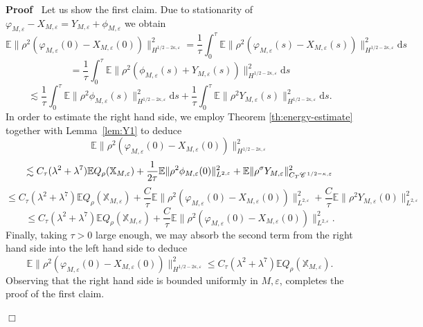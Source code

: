 \documentclass[a4paper,11pt]{article}
\newcommand{\mathd}{\mathrm{d}}
\newenvironment{proof}{\noindent\textbf{Proof\ }}{\hspace*{\fill}$\Box$\medskip}
\numberwithin{equation}{section}
\newcommand{\CC}{\mathscr{C} \hspace{.1em}}
\begin{document}
\begin{proof}
  Let us  show the first claim. Due to stationarity of $\varphi_{M,
  \varepsilon} - X_{M, \varepsilon} = Y_{M, \varepsilon} + \phi_{M,
  \varepsilon}$ we obtain
  \[ \mathbb{E} \| \rho^2 (\varphi_{M, \varepsilon} (0) - X_{M, \varepsilon}
     (0)) \|_{H^{1 / 2 - 2 \kappa, \varepsilon}}^2 = \frac{1}{\tau}
     \int_0^{\tau} \mathbb{E} \| \rho^2 (\varphi_{M, \varepsilon} (s) - X_{M,
     \varepsilon} (s)) \|_{H^{1 / 2 - 2 \kappa, \varepsilon}}^2 \mathd s \]
  \[ = \frac{1}{\tau} \int_0^{\tau} \mathbb{E} \| \rho^2 (\phi_{M,
     \varepsilon} (s) + Y_{M, \varepsilon} (s)) \|_{H^{1 / 2 - 2 \kappa,
     \varepsilon}}^2 \mathd s \]
  \[ \lesssim \frac{1}{\tau} \int_0^{\tau} \mathbb{E} \| \rho^2 \phi_{M,
     \varepsilon} (s) \|_{H^{1 / 2 - 2 \kappa, \varepsilon}}^2 \mathd s +
     \frac{1}{\tau} \int_0^{\tau} \mathbb{E} \| \rho^2 Y_{M, \varepsilon} (s)
     \|_{H^{1 / 2 - 2 \kappa, \varepsilon}}^2 \mathd s. \]
  In order to estimate the  right hand side, we employ Theorem \ref{th:energy-estimate} together with Lemma~\ref{lem:Y1} to deduce
  \[ \mathbb{E} \| \rho^2 (\varphi_{M, \varepsilon} (0) - X_{M, \varepsilon}
     (0)) \|_{H^{1 / 2 - 2 \kappa, \varepsilon}}^2 \]
  \[ \lesssim C_{\tau}(\lambda^2 +  \lambda^{7})\mathbb{E}Q_{\rho}
     (\mathbb{X}_{M, \varepsilon}) + \frac{1}{2\tau} \mathbb{E} \| \rho^2 \phi_{M,
     \varepsilon} (0) \|_{L^{2, \varepsilon}}^2 +\mathbb{E}\|\rho^{\sigma}Y_{M,\varepsilon}\|_{C_{T}\CC^{1/2-\kappa,\varepsilon}}^{2}\]
  \[ \leqslant C_{\tau} (\lambda^2 +  \lambda^{7})\mathbb{E}Q_{\rho} (\mathbb{X}_{M, \varepsilon}) +\frac{C}{\tau}
     \mathbb{E} \| \rho^2 (\varphi_{M, \varepsilon} (0) - X_{M, \varepsilon}
     (0)) \|_{L^{2, \varepsilon}}^2 + \frac{C}{\tau}\mathbb{E} \| \rho^2 Y_{M,\varepsilon}
     (0) \|_{L^{2, \varepsilon}}^2 \]
  \[ \leqslant C_{\tau}(\lambda^2 +  \lambda^{7}) \mathbb{E}Q_{\rho} (\mathbb{X}_{M, \varepsilon}) +
     \frac{C}{\tau}\mathbb{E} \| \rho^2 (\varphi_{M, \varepsilon} (0) - X_{M, \varepsilon}
     (0)) \|_{L^{2, \varepsilon}}^2 .\]
  Finally, taking $\tau > 0$ large enough, we may absorb the second term from
  the right hand side into the left hand side to deduce
  \[ \mathbb{E} \| \rho^2 (\varphi_{M, \varepsilon} (0) - X_{M, \varepsilon}
     (0)) \|_{H^{1 / 2 - 2 \kappa, \varepsilon}}^2 \leqslant C_{\tau} ({\lambda^2} +  \lambda^{7})
     \mathbb{E}Q_{\rho} (\mathbb{X}_{M, \varepsilon}) . \]
  Observing that the right hand side is bounded uniformly in $M,\varepsilon$, completes the proof of the first claim.
  

\end{proof}
\end{document}
